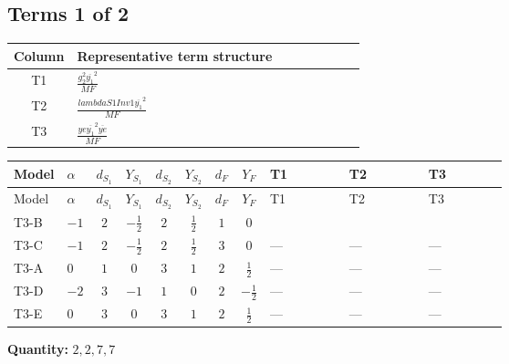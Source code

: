 \documentclass[8pt]{article}
\begin{document}
\begin{landscape}
\subsection*{Terms 1 of 2}
\begin{center}
\begin{tabular}{@{}c >{\raggedright\arraybackslash}p{0.82\linewidth}@{}}
\toprule
Column & Representative term structure \\
\midrule
T1 & \(\displaystyle \frac{g_{2}^{2} \overline{y_{1}}^{2}}{MF}\) \\
\midrule
T2 & \(\displaystyle \frac{lambdaS1Inv1 \overline{y_{1}}^{2}}{MF}\) \\
\midrule
T3 & \(\displaystyle \frac{ye \overline{y_{1}}^{2} \overline{ye}}{MF}\) \\
\midrule
\bottomrule
\end{tabular}
\end{center}
\smallskip
\tiny
\begin{longtable}{@{}llcccccc >{\raggedright\arraybackslash}p{0.21\linewidth} >{\raggedright\arraybackslash}p{0.21\linewidth} >{\raggedright\arraybackslash}p{0.21\linewidth}@{}}
\toprule
Model & $\alpha$ & $d_{S_1}$ & $Y_{S_1}$ & $d_{S_2}$ & $Y_{S_2}$ & $d_F$ & $Y_F$ & T1 & T2 & T3 \\
\midrule
\endfirsthead
\toprule
Model & $\alpha$ & $d_{S_1}$ & $Y_{S_1}$ & $d_{S_2}$ & $Y_{S_2}$ & $d_F$ & $Y_F$ & T1 & T2 & T3 \\
\midrule
\endhead
T3-B & $-1$ & $2$ & $-\frac{1}{2}$ & $2$ & $\frac{1}{2}$ & $1$ & $0$ & \scriptsize\adjustbox{max width=\linewidth}{$\begin{gathered} - \frac{3 g_{2}^{2} \overline{y_{1}}^{2}}{4 MF}\end{gathered}$} & \scriptsize\adjustbox{max width=\linewidth}{$\begin{gathered} - \frac{lambdaS1Inv1 \overline{y_{1}}^{2}}{2 MF}\end{gathered}$} & \scriptsize\adjustbox{max width=\linewidth}{$\begin{gathered} \frac{ye \overline{y_{1}}^{2} \overline{ye}}{4 MF}\end{gathered}$} \\
\midrule
T3-C & $-1$ & $2$ & $-\frac{1}{2}$ & $2$ & $\frac{1}{2}$ & $3$ & $0$ & --- & --- & --- \\
\midrule
T3-A & $0$ & $1$ & $0$ & $3$ & $1$ & $2$ & $\frac{1}{2}$ & --- & --- & --- \\
\midrule
T3-D & $-2$ & $3$ & $-1$ & $1$ & $0$ & $2$ & $-\frac{1}{2}$ & --- & --- & --- \\
\midrule
T3-E & $0$ & $3$ & $0$ & $3$ & $1$ & $2$ & $\frac{1}{2}$ & --- & --- & --- \\
\midrule
\bottomrule
\end{longtable}
\clearpage
\noindent\textbf{Quantity: }$\mathrm{2,2,7,7}$\par\smallskip

\end{landscape}
\end{document}
